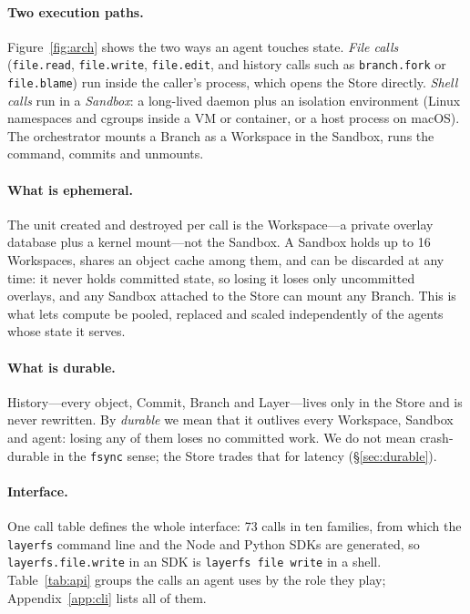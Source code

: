 \documentclass[letterpaper,twocolumn,10pt]{article}
\newcommand{\ws}{Workspace}
\begin{document}
\paragraph{Two execution paths.} Figure~\ref{fig:arch} shows the two ways an
agent touches state. \emph{File calls} (\texttt{file.read}, \texttt{file.write},
\texttt{file.edit}, and history calls such as \texttt{branch.fork} or
\texttt{file.blame}) run inside the caller's process, which opens the Store
directly. \emph{Shell calls} run in a \emph{Sandbox}: a long-lived daemon
plus an isolation environment (Linux namespaces and cgroups inside a VM or
container, or a host process on macOS). The orchestrator mounts a Branch as
a \ws{} in the Sandbox, runs the command, commits and unmounts.

\paragraph{What is ephemeral.} The unit created and destroyed per call is
the \ws{}---a private overlay database plus a kernel mount---not the Sandbox.
A Sandbox holds up to 16 \ws{}s, shares an object cache among them, and can
be discarded at any time: it never holds committed state, so losing it loses
only uncommitted overlays, and any Sandbox attached to the Store can mount
any Branch. This is what lets compute be pooled, replaced and scaled
independently of the agents whose state it serves.

\paragraph{What is durable.} History---every object, Commit, Branch and
Layer---lives only in the Store and is never rewritten. By \emph{durable}
we mean that it outlives every \ws{}, Sandbox and agent: losing any of them
loses no committed work. We do not mean crash-durable in the
\texttt{fsync} sense; the Store trades that for latency
(\S\ref{sec:durable}).

\paragraph{Interface.} One call table defines the whole interface: 73 calls
in ten families, from which the \texttt{layerfs} command line and the Node
and Python SDKs are generated, so \texttt{layerfs.file.write} in an SDK is
\texttt{layerfs file write} in a shell. Table~\ref{tab:api} groups the calls
an agent uses by the role they play; Appendix~\ref{app:cli} lists all of them.
\end{document}

